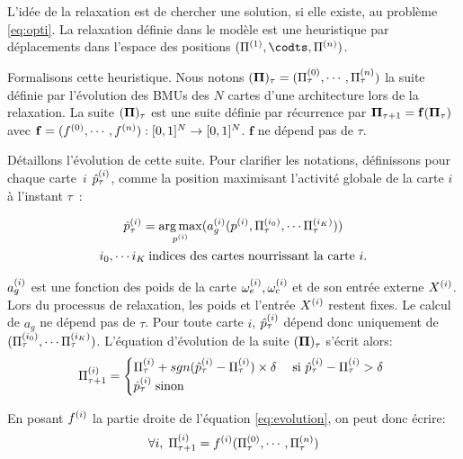 \documentclass[../main]{subfiles}
\begin{document}
L'idée de la relaxation est de chercher une solution, si elle existe, au problème \ref{eq:opti}.
La relaxation définie dans le modèle est une heuristique par déplacements dans l'espace des positions $(\bmu\m{1},\codts, \bmu\m{n})$.

Formalisons cette heuristique.
Nous notons $(\mathbf{\Pi})_\tau = (\Pi^{({0})}_\tau,\cdots,\Pi^{({n})}_\tau)$ la suite définie par l'évolution des BMUs des $N$ cartes d'une architecture lors de la relaxation.
La suite $(\mathbf{\Pi})_\tau$ est une suite définie par récurrence par $\mathbf{\Pi}_{\tau+1} = \mathbf{f}(\mathbf{\Pi}_\tau)$ avec $\mathbf{f} = (f^{({0})},\cdots,f^{({n})}) : [0,1]^N \rightarrow [0,1]^N$. 
$\mathbf{f}$ ne dépend pas de $\tau$. 

Détaillons l'évolution de cette suite.
Pour clarifier les notations, définissons pour chaque carte~$i$ $\hat{p}^{({i})}_\tau$, comme la position maximisant l'activité globale de la carte $i$ à l'instant $\tau$~:

\begin{equation}
\begin{gathered}
\hat{p}^{({i})}_{\tau} = \operatorname*{arg\,max}_{p^{({i})}}(a_g^{({i})}(p^{({i})},\Pi^{({i_0})}_\tau, \cdots \Pi^{({i_K})}_\tau))\\
 i_0, \cdots i_K \: \text{indices des cartes nourrissant la carte $i$}.
\end{gathered}
\label{eq:pstar}
\end{equation}


$a_g^{({i})}$ est une fonction des poids de la carte $\omega_{e}^{({i})}, \omega_{c}^{({i})}$ et de son entrée externe $X^{({i})}$. Lors du processus de relaxation, les poids et l'entrée $X^{({i})}$ restent fixes. Le calcul de $a_g$ ne dépend pas de $\tau$. Pour toute carte $i$, $\hat{p}^{({i})}_{\tau}$ dépend donc uniquement de $(\Pi^{({i_0})}_\tau, \cdots \Pi^{({i_K})}_\tau)$. L'équation d'évolution de la suite $(\mathbf{\Pi})_\tau$ s'écrit alors: 
\begin{equation}
\Pi^{({i})}_{\tau+1} = 
\begin{cases}
\Pi^{({i})}_{\tau} + sgn(\hat{p}^{({i})}_{\tau} - \Pi^{({i})}_{\tau}) \times \delta \; & \text{si $\hat{p}^{({i})}_{\tau} - \Pi^{({i})}_{\tau} > \delta$ } \\
\hat{p}^{({i})}_{\tau} \; \text{sinon}	
\end{cases}
\label{eq:evolution}
\end{equation}

En posant $f^{({i})}$ la partie droite de l'équation \ref{eq:evolution}, on peut donc écrire: 
\begin{equation}
\forall i, \; \Pi^{({i})}_{\tau +1} = f^{({i})}(\Pi^{({0})}_\tau,\cdots,\Pi^{({n})}_\tau)
\label{eq:fonction}
\end{equation}
\end{document}
